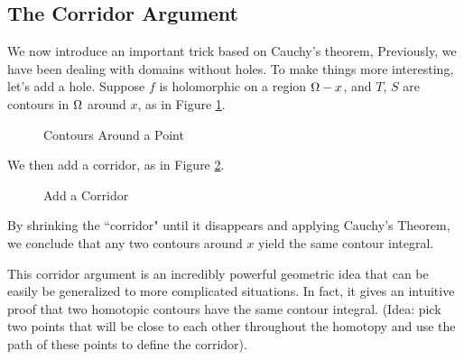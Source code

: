 \subsection{The Corridor Argument}
We now introduce an important trick based on Cauchy's theorem, Previously, we have been dealing with domains without holes. To make things more
interesting, let's add a hole. Suppose $f$ is holomorphic on a region $\Omega - x$,
and $T$, $S$ are contours in $\Omega$ around $x$, as in Figure \ref{fig:Contour-around-a-Point}.
\begin{figure}[ht]
    \centering
    \caption{Contours Around a Point}
    \label{fig:Contour-around-a-Point}
\end{figure}
We then add a corridor, as in Figure \ref{fig:Add-a-Keyhole}.
\begin{figure}[ht]
    \centering
    \caption{Add a Corridor}
    \label{fig:Add-a-Keyhole}
\end{figure}
By shrinking the ``corridor" until it disappears 
and applying Cauchy's Theorem, we conclude that any two contours around $x$ yield the same contour integral.

This corridor argument is an incredibly powerful geometric idea that can be easily be generalized to more complicated situations. In fact, it gives an intuitive proof that two homotopic contours have the same contour integral. (Idea: pick two points that will be close to each other throughout the homotopy and use the path of these points to define the corridor).
